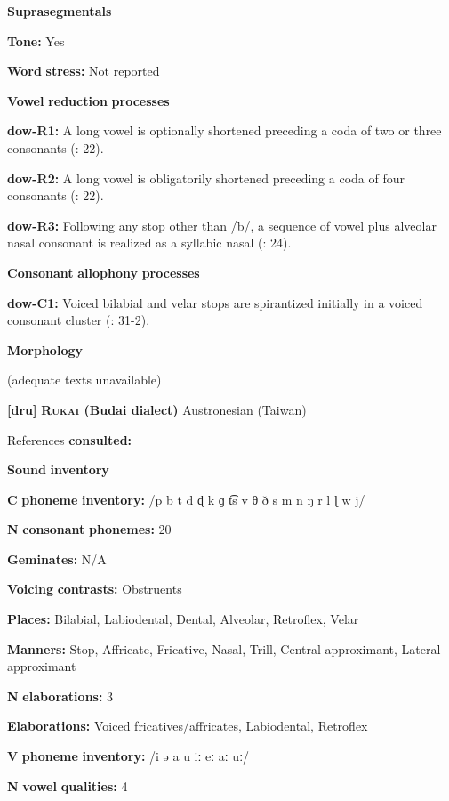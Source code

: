 \begin{styleBody}
\textbf{Suprasegmentals}

\textbf{Tone:} Yes

\textbf{Word} \textbf{stress:} Not reported

\textbf{Vowel} \textbf{reduction} \textbf{processes}

\textbf{dow-R1:} A long vowel is optionally shortened preceding a coda of two or three consonants (\citealt{WieringWiering1994}: 22).

\textbf{dow-R2:} A long vowel is obligatorily shortened preceding a coda of four consonants (\citealt{WieringWiering1994}: 22).

\textbf{dow-R3:} Following any stop other than /b/, a sequence of vowel plus alveolar nasal consonant is realized as a syllabic nasal (\citealt{WieringWiering1994}: 24).

\textbf{Consonant} \textbf{allophony} \textbf{processes}

\textbf{dow-C1:} Voiced bilabial and velar stops are spirantized initially in a voiced consonant cluster (\citealt{WieringWiering1994}: 31-2).

\textbf{Morphology}

(adequate texts unavailable)

\textbf{[dru]}   \textbf{\textsc{Rukai} \textbf{(Budai} \textbf{dialect)}  }Austronesian (Taiwan)

References \textbf{consulted:} \citet{Chen2006}

\textbf{Sound} \textbf{inventory}

\textbf{C} \textbf{phoneme} \textbf{inventory:} /p b t d ɖ k ɡ t͡s v θ ð s m n ŋ r l ɭ w j/

\textbf{N} \textbf{consonant} \textbf{phonemes:} 20

\textbf{Geminates:} N/A

\textbf{Voicing} \textbf{contrasts:} Obstruents

\textbf{Places:} Bilabial, Labiodental, Dental, Alveolar, Retroflex, Velar

\textbf{Manners:} Stop, Affricate, Fricative, Nasal, Trill, Central approximant, Lateral approximant

\textbf{N} \textbf{elaborations:} 3

\textbf{Elaborations:} Voiced fricatives/affricates, Labiodental, Retroflex

\textbf{V} \textbf{phoneme} \textbf{inventory:} /i ə a u iː eː aː uː/

\textbf{N} \textbf{vowel} \textbf{qualities:} 4


\end{styleBody}
